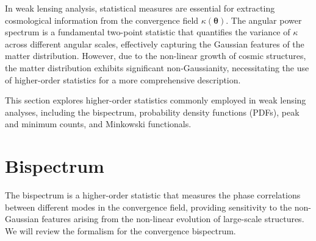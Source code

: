 In weak lensing analysis, statistical measures are essential for extracting cosmological information from the convergence field $\kappa(\boldsymbol{\theta})$. The angular power spectrum is a fundamental two-point statistic that quantifies the variance of $\kappa$ across different angular scales, effectively capturing the Gaussian features of the matter distribution. However, due to the non-linear growth of cosmic structures, the matter distribution exhibits significant non-Gaussianity, necessitating the use of higher-order statistics for a more comprehensive description.

This section explores higher-order statistics commonly employed in weak lensing analyses, including the bispectrum, probability density functions (PDFs), peak and minimum counts, and Minkowski functionals. 

\section{Bispectrum}
\label{sec:bispectrum}
The bispectrum is a higher-order statistic that measures the phase correlations between different modes in the convergence field, providing sensitivity to the non-Gaussian features arising from the non-linear evolution of large-scale structures. We will review \citet{2004MNRAS.348..897T} the formalism for the convergence bispectrum.

